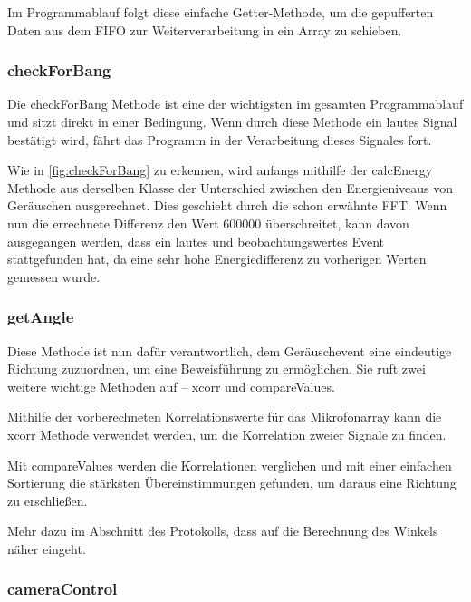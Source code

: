 Im Programmablauf folgt diese einfache Getter-Methode, um die gepufferten Daten aus dem FIFO zur Weiterverarbeitung in ein Array zu schieben.

\subsubsection{checkForBang}

Die checkForBang Methode ist eine der wichtigsten im gesamten Programmablauf und sitzt direkt in einer Bedingung. Wenn durch diese Methode ein lautes Signal bestätigt wird, fährt das Programm in der Verarbeitung dieses Signales fort.

Wie in \autoref{fig:checkForBang} zu erkennen, wird anfangs mithilfe der calcEnergy Methode aus derselben Klasse der Unterschied zwischen den Energieniveaus von Geräuschen ausgerechnet. Dies geschieht durch die schon erwähnte FFT. Wenn nun die errechnete Differenz den Wert 600000 überschreitet, kann davon ausgegangen werden, dass ein lautes und beobachtungswertes Event stattgefunden hat, da eine sehr hohe Energiedifferenz zu vorherigen Werten gemessen wurde.

%

\subsubsection{getAngle}

Diese Methode ist nun dafür verantwortlich, dem Geräuschevent eine eindeutige Richtung zuzuordnen, um eine Beweisführung zu ermöglichen. Sie ruft zwei weitere wichtige Methoden auf – xcorr und compareValues.

Mithilfe der vorberechneten Korrelationswerte für das Mikrofonarray kann die xcorr Methode verwendet werden, um die Korrelation zweier Signale zu finden.

Mit compareValues werden die Korrelationen verglichen und mit einer einfachen Sortierung die stärksten Übereinstimmungen gefunden, um daraus eine Richtung zu erschließen.

Mehr dazu im Abschnitt des Protokolls, dass auf die Berechnung des Winkels näher eingeht.

\subsubsection{cameraControl}

